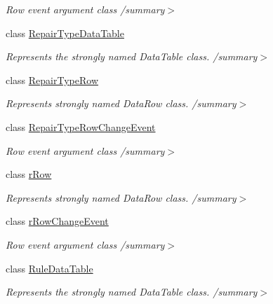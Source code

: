 \begin{DoxyCompactItemize}
\begin{DoxyCompactList}\small\item\em Row event argument class /summary$>$ \end{DoxyCompactList}\item 
class \hyperlink{class_env_int_1_1_win32_1_1_field_tech_1_1_manager_1_1_data_sets_1_1_guide_ware_mobile_data_set_1_1_repair_type_data_table}{Repair\+Type\+Data\+Table}
\begin{DoxyCompactList}\small\item\em Represents the strongly named Data\+Table class. /summary$>$ \end{DoxyCompactList}\item 
class \hyperlink{class_env_int_1_1_win32_1_1_field_tech_1_1_manager_1_1_data_sets_1_1_guide_ware_mobile_data_set_1_1_repair_type_row}{Repair\+Type\+Row}
\begin{DoxyCompactList}\small\item\em Represents strongly named Data\+Row class. /summary$>$ \end{DoxyCompactList}\item 
class \hyperlink{class_env_int_1_1_win32_1_1_field_tech_1_1_manager_1_1_data_sets_1_1_guide_ware_mobile_data_set_86bb317b23e29e52c68c56fabaaadc6a}{Repair\+Type\+Row\+Change\+Event}
\begin{DoxyCompactList}\small\item\em Row event argument class /summary$>$ \end{DoxyCompactList}\item 
class \hyperlink{class_env_int_1_1_win32_1_1_field_tech_1_1_manager_1_1_data_sets_1_1_guide_ware_mobile_data_set_1_1r_row}{r\+Row}
\begin{DoxyCompactList}\small\item\em Represents strongly named Data\+Row class. /summary$>$ \end{DoxyCompactList}\item 
class \hyperlink{class_env_int_1_1_win32_1_1_field_tech_1_1_manager_1_1_data_sets_1_1_guide_ware_mobile_data_set_1_1r_row_change_event}{r\+Row\+Change\+Event}
\begin{DoxyCompactList}\small\item\em Row event argument class /summary$>$ \end{DoxyCompactList}\item 
class \hyperlink{class_env_int_1_1_win32_1_1_field_tech_1_1_manager_1_1_data_sets_1_1_guide_ware_mobile_data_set_1_1_rule_data_table}{Rule\+Data\+Table}
\begin{DoxyCompactList}\small\item\em Represents the strongly named Data\+Table class. /summary$>$ \end{DoxyCompactList}\item 

\end{DoxyCompactItemize}
